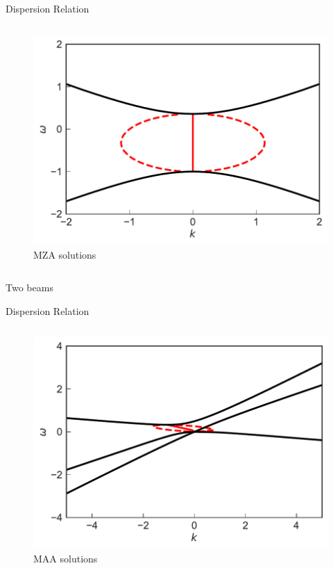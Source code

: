 \documentclass[9pt]{beamer}
\begin{document}
\begin{darkframes}
\begin{frame}{Dispersion Relation}
\begin{columns}[T]
\begin{column}{0.5\textwidth}
   \begin{figure}
      \includegraphics[width=\linewidth]{assets/dr/spectDBWC1DRDBMZAPltBlob.pdf}
      \caption*{ MZA solutions}
   \end{figure}
\end{column}

   \end{columns}

\begin{tcolorbox}
   \centering
   Two beams
\end{tcolorbox}

\end{frame}

\begin{frame}{Dispersion Relation}



   \begin{columns}[T]

\begin{column}{0.5\textwidth}
   \begin{figure}
     \includegraphics[width=\linewidth]{assets/dr/spectDB3WC4DRDBMAAPltBlob.pdf}
     \caption*{MAA solutions}
  \end{figure}
\end{column}


\end{columns}
\end{frame}
\end{darkframes}
\end{document}
